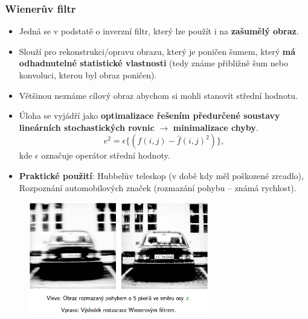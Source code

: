 \subsubsection{Wienerův filtr}
\begin{itemize}
\item Jedná se v podstatě o inverzní filtr, který lze použít i na \textbf{zašumělý obraz}.
\item Slouží pro rekonstrukci/opravu obrazu, který je poničen šumem, který \textbf{má odhadnutelné statistické vlastnosti} (tedy známe přibližně šum nebo konvoluci, kterou byl obraz poničen).
\item Většinou neznáme cílový obraz abychom si mohli stanovit střední hodnotu.
\item Úloha se vyjádří jako \textbf{optimalizace řešením předurčené soustavy lineárních stochastických rovnic} $\rightarrow$ \textbf{minimalizace chyby}.
\begin{equation*}
e^2 = \epsilon \{(f(i, j) - \hat{f}(i, j)^2 )\},
\end{equation*}
kde $\epsilon$ označuje operátor střední hodnoty.
\item \textbf{Praktické použití}: Hubbelův teleskop (v době kdy měl poškozené zrcadlo), Rozpoznání automobilových značek (rozmazání pohybu -- známá rychlost).
\end{itemize}

\begin{figure}[H]
	\centering
	\includegraphics[width=0.7\textwidth]{assets/8_wiener}
\end{figure}